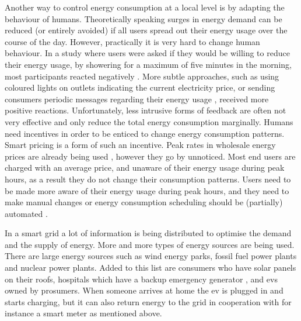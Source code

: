 Another way to control energy consumption at a local level is by adapting the behaviour of humans. Theoretically speaking surges in energy demand can be reduced (or entirely avoided) if all users spread out their energy usage over the course of the day. However, practically it is very hard to change human behaviour. In a study where users were asked if they would be willing to reduce their energy usage, by showering for a maximum of five minutes in the morning, most participants reacted negatively \cite{GouldenBedwellRennick-EgglestoneEtAl2014}. More subtle approaches, such as using coloured lights on outlets indicating the current electricity price, or sending consumers periodic messages regarding their energy usage \cite{AyresRasemanShih2012}, received more positive reactions. Unfortunately, less intrusive forms of feedback are often not very effective and only reduce the total energy consumption marginally. Humans need incentives in order to be enticed to change energy consumption patterns. Smart pricing is a form of such an incentive. Peak rates in wholesale energy prices are already being used \cite{SamadiMohsenian-RadSchoberEtAl2012}, however they go by unnoticed. Most end users are charged with an average price, and unaware of their energy usage during peak hours, as a result they do not change their consumption patterns. Users need to be made more aware of their energy usage during peak hours, and they need to make manual changes \cite{Mohsenian-RadLeon-Garcia2010} or energy consumption scheduling should be (partially) automated \cite{SamadiMohsenian-RadSchoberEtAl2012}.

In a smart grid a lot of information is being distributed to optimise the demand and the supply of energy. More and more types of energy sources are being used. There are large energy sources such as wind energy parks, fossil fuel power plants and nuclear power plants. Added to this list are consumers who have solar panels on their roofs, hospitals which have a backup emergency generator \cite{Kumagai2012}, and \acp{ev} owned by prosumers. When someone arrives at home the \ac{ev} is plugged in and starts charging, but it can also return energy to the grid in cooperation with for instance a smart meter as mentioned above.

